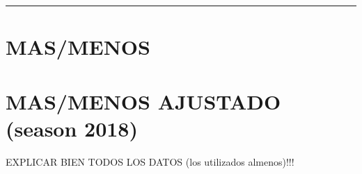 \documentclass[
]{article}
\newenvironment{Shaded}{\begin{snugshade}}{\end{snugshade}}
\newcommand{\CommentTok}[1]{\textcolor[rgb]{0.56,0.35,0.01}{\textit{#1}}}
\newcommand{\FunctionTok}[1]{\textcolor[rgb]{0.00,0.00,0.00}{#1}}
\newcommand{\NormalTok}[1]{#1}
\newcommand{\OtherTok}[1]{\textcolor[rgb]{0.56,0.35,0.01}{#1}}
\newcommand{\SpecialCharTok}[1]{\textcolor[rgb]{0.00,0.00,0.00}{#1}}
\begin{document}
\begin{center}\rule{0.5\linewidth}{0.5pt}\end{center}

\hypertarget{masmenos}{%
\section{MAS/MENOS}\label{masmenos}}

\hypertarget{masmenos-ajustado-season-2018}{%
\section{MAS/MENOS AJUSTADO (season
2018)}\label{masmenos-ajustado-season-2018}}

\begin{Shaded}
\end{Shaded}

EXPLICAR BIEN TODOS LOS DATOS (los utilizados almenos)!!!
\end{document}
